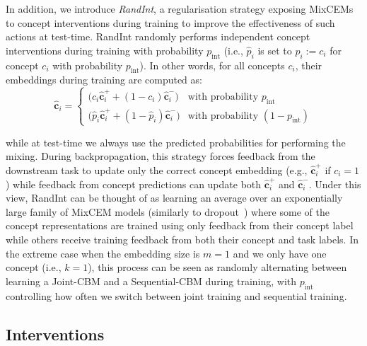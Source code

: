 \documentclass[withindex,glossary]{cam-thesis}
\theoremstyle{plain}
\theoremstyle{definition}
\theoremstyle{remark}
\begin{document}
In addition, we introduce \textit{RandInt}, a regularisation strategy exposing MixCEMs to concept interventions during training to improve the effectiveness of such actions at test-time. RandInt randomly performs independent concept interventions during training with probability $p_\text{int}$ (i.e., $\hat{p}_i$ is set to $\hat{p}_i := c_i$ for concept $c_i$ with probability $p_\text{int}$). In other words, for all concepts $c_i$, their embeddings during training are computed as:
\[
    \hat{\mathbf{c}}_i = \begin{cases}
        \big(c_i \hat{\mathbf{c}}^+_i + (1 - c_i) \hat{\mathbf{c}}^-_i\big) & \text{with probability } p_\text{int} \\
        \big(\hat{p}_i \hat{\mathbf{c}}^+_i + (1 - \hat{p}_i) \hat{\mathbf{c}}^-_i\big) & \text{with probability } (1 - p_\text{int})
    \end{cases}
\]

while at test-time we always use the predicted probabilities for performing the mixing. During backpropagation, this strategy forces feedback from the downstream task to update only the correct concept embedding (e.g., $\hat{\mathbf{c}}^+_i$ if $c_i = 1$) while feedback from concept predictions can update both $\hat{\mathbf{c}}^+_i$ and $\hat{\mathbf{c}}^-_i$. Under this view, RandInt can be thought of as learning an average over an exponentially large family of MixCEM models (similarly to dropout~\citep{srivastava2014dropout}) where some of the concept representations are trained using only feedback from their concept label while others receive training feedback from both their concept and task labels. In the extreme case when the embedding size is $m = 1$ and we only have one concept (i.e., $k = 1$), this process can be seen as randomly alternating between learning a Joint-CBM and a Sequential-CBM during training, with $p_\text{int}$ controlling how often we switch between joint training and sequential training.


\subsection{Interventions}
\end{document}
